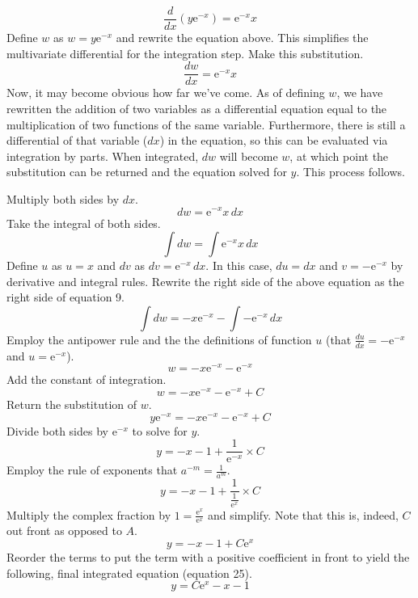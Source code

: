 \documentclass{article}
\begin{document}
\begin{equation*}
    \frac{d}{dx}\left(y\text{e}^{-x}\right)=\text{e}^{-x}x
\end{equation*}
Define $w$ as $w=y\text{e}^{-x}$ and rewrite the equation above. This simplifies the multivariate differential for the integration step. Make this substitution.
\begin{equation*}
    \frac{dw}{dx}=\text{e}^{-x}x
\end{equation*}
Now, it may become obvious how far we've come. As of defining $w$, we have rewritten the addition of two variables as a differential equation equal to the multiplication of two functions of the same variable. Furthermore, there is still a differential of that variable ($dx$) in the equation, so this can be evaluated via integration by parts. When integrated, $dw$ will become $w$, at which point the substitution can be returned and the equation solved for $y$. This process follows.\par
Multiply both sides by $dx$.
\begin{equation*}
    dw=\text{e}^{-x}x\, dx
\end{equation*}
Take the integral of both sides.
\begin{equation*}
    \int dw=\int\text{e}^{-x}x\, dx
\end{equation*}
Define $u$ as $u=x$ and $dv$ as $dv=\text{e}^{-x}\, dx$. In this case, $du=dx$ and $v=-\text{e}^{-x}$ by derivative and integral rules. Rewrite the right side of the above equation as the right side of equation 9.
\begin{equation*}
    \int dw=-x\text{e}^{-x}-\int -\text{e}^{-x}\, dx
\end{equation*}
Employ the antipower rule and the the definitions of function $u$ (that $\frac{du}{dx}=-\text{e}^{-x}$ and $u=\text{e}^{-x}$).
\begin{equation*}
    w=-x\text{e}^{-x}-\text{e}^{-x}
\end{equation*}
Add the constant of integration.
\begin{equation*}
    w=-x\text{e}^{-x}-\text{e}^{-x}+C
\end{equation*}
Return the substitution of $w$.
\begin{equation*}
    y\text{e}^{-x}=-x\text{e}^{-x}-\text{e}^{-x}+C
\end{equation*}
Divide both sides by $\text{e}^{-x}$ to solve for $y$.
\begin{equation*}
    y=-x-1+\frac{1}{\text{e}^{-x}}\times C
\end{equation*}
Employ the rule of exponents that $a^{-m}=\frac{1}{a^m}$.
\begin{equation*}
    y=-x-1+\frac{1}{\frac{1}{\text{e}^{x}}}\times C
\end{equation*}
Multiply the complex fraction by $1=\frac{\text{e}^{x}}{\text{e}^{x}}$ and simplify. Note that this is, indeed, $C$ out front as opposed to $A$.
\begin{equation*}
    y=-x-1+C\text{e}^{x}
\end{equation*}
Reorder the terms to put the term with a positive coefficient in front to yield the following, final integrated equation (equation 25).
\begin{equation}
    y=C\text{e}^{x}-x-1
\end{equation}
\end{document}

